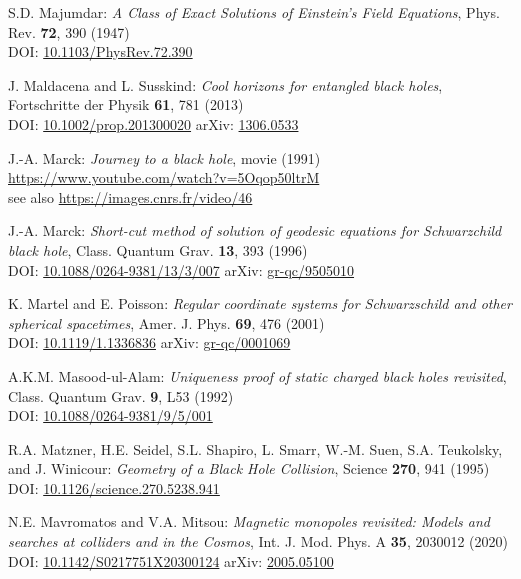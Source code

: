\begin{thebibliography}{123}
S.D. Majumdar:
{\em A Class of Exact Solutions of Einstein's Field Equations},
Phys. Rev. {\bf 72}, 390 (1947)\\
DOI: \href{https://doi.org/10.1103/PhysRev.72.390}{10.1103/PhysRev.72.390}

J. Maldacena and L. Susskind:
{\em Cool horizons for entangled black holes},
Fortschritte der Physik {\bf 61}, 781 (2013)\\
DOI: \href{https://doi.org/10.1002/prop.201300020}{10.1002/prop.201300020}\hfill
arXiv: \href{https://arxiv.org/abs/1306.0533}{1306.0533}

J.-A. Marck:
{\em Journey to a black hole}, movie (1991)\\
\url{https://www.youtube.com/watch?v=5Oqop50ltrM}\\
see also \url{https://images.cnrs.fr/video/46}

J.-A. Marck:
{\em Short-cut method of solution of geodesic equations for Schwarzchild black hole},
Class. Quantum Grav. {\bf 13}, 393 (1996)\\
DOI: \href{https://doi.org/10.1088/0264-9381/13/3/007}{10.1088/0264-9381/13/3/007}\hfill
arXiv: \href{https://arxiv.org/abs/gr-qc/9505010}{gr-qc/9505010}

K. Martel and E. Poisson:
{\em Regular coordinate systems for Schwarzschild and other spherical spacetimes},
Amer. J. Phys. {\bf 69}, 476 (2001)\\
DOI: \href{https://doi.org/10.1119/1.1336836}{10.1119/1.1336836}\hfill
arXiv: \href{https://arxiv.org/abs/gr-qc/0001069}{gr-qc/0001069}

A.K.M. Masood-ul-Alam:
{\em Uniqueness proof of static charged black holes revisited},
Class. Quantum Grav. {\bf 9}, L53 (1992)\\
DOI: \href{https://doi.org/10.1088/0264-9381/9/5/001}{10.1088/0264-9381/9/5/001}

R.A. Matzner, H.E. Seidel, S.L. Shapiro, L. Smarr, W.-M. Suen, S.A. Teukolsky, and
J. Winicour: {\em Geometry of a Black Hole Collision},
Science {\bf 270}, 941 (1995)\\
DOI: \href{https://doi.org/10.1126/science.270.5238.941}{10.1126/science.270.5238.941}

N.E. Mavromatos and V.A. Mitsou:
{\em Magnetic monopoles revisited: Models and searches at colliders and in the Cosmos},
Int. J. Mod. Phys. A {\bf 35}, 2030012 (2020)\\
DOI: \href{https://doi.org/10.1142/S0217751X20300124}{10.1142/S0217751X20300124}\hfill
arXiv: \href{https://arxiv.org/abs/2005.05100}{2005.05100}


\end{thebibliography}
